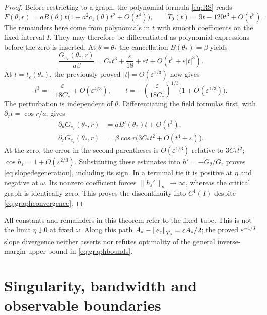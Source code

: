 \documentclass[11pt,a4paper]{article}
\begin{document}
\begin{proof}
Before restricting to a graph, the polynomial formula \eqref{eq:RS}
reads
\[
 F(\theta,r)=aB(\theta)t
       \bigl(1-a^2c_1(\theta)t^2+O(t^4)\bigr),\qquad
 T_9(t)=9t-120t^3+O(t^5).
\]
The remainders here come from polynomials in $t$ with smooth
coefficients on the fixed interval $I$. They may therefore be
differentiated as polynomial expressions before the zero is inserted.
At $\theta=\theta_*$ the cancellation $B(\theta_*)=\beta$ yields
\begin{equation}\label{eq:cubicexpansion}
 \frac{G_{e_\varepsilon}(\theta_*,r)}{a\beta}
 =C_*t^3+\frac{\varepsilon}{18}
    +\varepsilon t+O(t^5+\varepsilon|t|^3).
\end{equation}
At $t=t_\varepsilon(\theta_*)$, the previously proved
$|t|=O(\varepsilon^{1/3})$ now gives
\[
 t^3=-\frac{\varepsilon}{18C_*}+O(\varepsilon^{4/3}),
 \qquad
 t=-\left(\frac{\varepsilon}{18C_*}\right)^{1/3}
       \bigl(1+O(\varepsilon^{1/3})\bigr).
\]
The perturbation is independent of $\theta$. Differentiating the
field formulas first, with $\partial_rt=\cos r/a$, gives
\begin{align}
 \partial_\theta G_{e_\varepsilon}(\theta_*,r)
   &=aB'(\theta_*)t+O(t^3),\label{eq:thetadegenerate}\\
 \partial_rG_{e_\varepsilon}(\theta_*,r)
   &=\beta\cos r\bigl(3C_*t^2+O(t^4+\varepsilon)\bigr).
       \label{eq:rdegenerate}
\end{align}
At the zero, the error in the second parentheses is
$O(\varepsilon^{1/3})$ relative to $3C_*t^2$;
$\cos h_\varepsilon=1+O(\varepsilon^{2/3})$.
Substituting these estimates into $h'=-G_\theta/G_r$ proves
\eqref{eq:slopedegeneration}, including its sign.
In a terminal tie it is positive at $\eta$ and negative at $\omega$.
Its nonzero coefficient forces $\|h_\varepsilon'\|_\infty\to\infty$,
whereas the critical graph is identically zero. This proves the
discontinuity into $C^1(I)$ despite \eqref{eq:graphconvergence}.
\end{proof}

All constants and remainders in this theorem refer to the fixed tube.
This is not the limit $\eta\downarrow0$ at fixed $\omega$.
Along this path $A_*-\left\lVert e_\varepsilon\right\rVert_{T_\eta}=\varepsilon A_*/2$;
the proved $\varepsilon^{-1/3}$ slope divergence neither asserts
nor refutes optimality of the general inverse-margin upper bound
in \eqref{eq:graphbounds}.

\section{Singularity, bandwidth and observable boundaries}\label{sec:limits}
\end{document}
